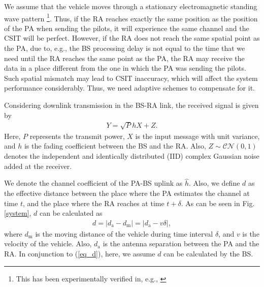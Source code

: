 We assume that the vehicle moves through a stationary electromagnetic standing wave pattern \footnote{This has been experimentally verified in, e.g., \cite{Jamaly2014EuCAP}}. Thus, if the RA reaches exactly the same position as the position of the PA when sending the pilots, it will experience the same channel and the CSIT will be perfect. However, if the RA does not reach the same spatial point as the PA, due to, e.g., the BS processing delay is not equal to the time that we need until the RA reaches the same point as the PA, the RA may receive the data in a place different from the one in which the PA was sending the pilots. Such spatial mismatch may lead to CSIT inaccuracy, which will affect the system performance considerably. Thus, we need adaptive schemes to compensate for it.

Considering downlink transmission in the BS-RA link, the received signal is given by
\begin{align}\label{eq_Y}
{{Y}} = \sqrt{P}hX + Z.
\end{align}
Here, $P$ represents the transmit power, $X$ is the input message with unit variance, and $h$ is the fading coefficient between the BS and the RA. Also, $Z \sim \mathcal{CN}(0,1)$ denotes the independent and identically distributed (IID) complex Gaussian noise added at the receiver.



We denote the channel coefficient of the PA-BS uplink as $\hat{h}$. Also, we define $d$ as the effective distance between  the place where the PA estimates the channel at time $t$, and the place where the RA reaches at time $t+\delta$. As can be seen in Fig. \ref{system}, $d$ can be calculated as
\begin{align}\label{eq_d}
    d = |d_\text{a} - d_\text{m} | = |d_\text{a} - v\delta|,
\end{align}
where $d_\text{m}$ is the moving distance of the vehicle during time interval $\delta$, and $v$ is the velocity of the vehicle. Also, $d_\text{a}$ is the antenna separation between the PA and the RA. In conjunction to (\ref{eq_d}), here, we assume $d$ can be calculated by the BS. 

